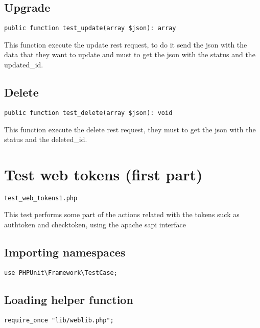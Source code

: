 \documentclass[a4paper]{book}
\begin{document}
\hypertarget{toc75}{}
\subsection{Upgrade}

\begin{lstlisting}
public function test_update(array $json): array
\end{lstlisting}

This function execute the update rest request, to do it send the json with
the data that they want to update and must to get the json with the status
and the updated\_id.

\hypertarget{toc76}{}
\subsection{Delete}

\begin{lstlisting}
public function test_delete(array $json): void
\end{lstlisting}

This function execute the delete rest request, they must to get the json
with the status and the deleted\_id.

\hypertarget{toc77}{}
\section{Test web tokens (first part)}

\begin{lstlisting}
test_web_tokens1.php
\end{lstlisting}

This test performs some part of the actions related with the tokens suck
as authtoken and checktoken, using the apache sapi interface

\hypertarget{toc78}{}
\subsection{Importing namespaces}

\begin{lstlisting}
use PHPUnit\Framework\TestCase;
\end{lstlisting}

\hypertarget{toc79}{}
\subsection{Loading helper function}

\begin{lstlisting}
require_once "lib/weblib.php";
\end{lstlisting}
\end{document}
